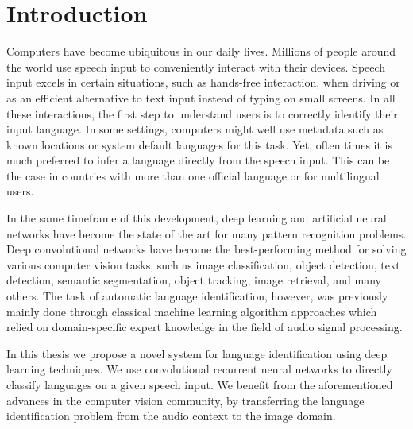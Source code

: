 \section{Introduction}


Computers have become ubiquitous in our daily lives. Millions of people around the world use speech input to conveniently interact with their devices.
Speech input excels in certain situations, such as hands-free interaction, when driving or as an efficient alternative to text input instead of typing on small screens.
In all these interactions, the first step to understand users is to correctly identify their input language. In some settings, computers might well use metadata such as known locations or system default languages for this task. Yet, often times it is much preferred to infer a language directly from the speech input. This can be the case in countries with more than one official language or for multilingual users. 

In the same timeframe of this development, deep learning and artificial neural networks have become the state of the art for many pattern recognition problems. 
Deep convolutional networks have become the best-performing method for solving various computer vision tasks, such as image classification\cite{russakovsky2015imagenet}, object detection\cite{russakovsky2015imagenet, everingham2010pascal}, text detection\cite{Yang2016SceneTextRegAR, jaderberg2014synthetic}, semantic segmentation\cite{dai2016instance, girshick2014rich}, object tracking\cite{nam2016learning}, image retrieval\cite{tolias2015particular}, and many others. 
The task of automatic language identification, however, was previously mainly done through classical machine learning algorithm approaches which relied on domain-specific expert knowledge in the field of audio signal processing.

In this thesis we propose a novel system for language identification using deep learning techniques. We use convolutional recurrent neural networks to directly classify languages on a given speech input. We benefit from the aforementioned advances in the computer vision community, by transferring the language identification problem from the audio context to the image domain.



